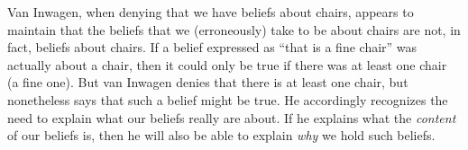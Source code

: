 \documentclass[11pt]{article}
\begin{document}
\begin{spacing}{1.5}
Van Inwagen, when denying that we have beliefs about chairs, appears
to maintain that the beliefs that we (erroneously) take to be about
chairs are not, in fact, beliefs about chairs.  If a belief expressed
as ``that is a fine chair'' was actually about a chair, then it could
only be true if there was at least one chair (a fine one).  But van
Inwagen denies that there is at least one chair, but nonetheless says
that such a belief might be true.  He accordingly recognizes the need
to explain what our beliefs really are about.  If he explains what the
{\em content} of our beliefs is, then he will also be able to explain
{\em why} we hold such beliefs.

\ifstandalone
\end{spacing}


\fi
\end{document}
